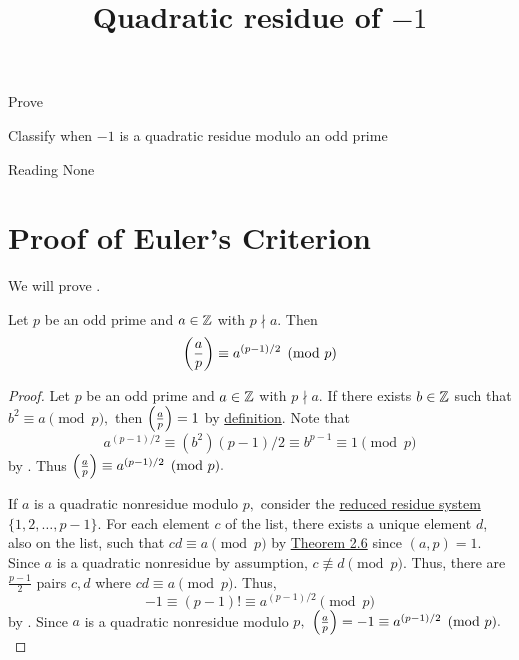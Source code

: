 \documentclass{ximera}
\title{Quadratic residue of $-1$}
\begin{document}
\begin{abstract}
\end{abstract}
\maketitle


\begin{obj}
    \item Prove 
	\item Classify when $-1$ is a quadratic residue modulo an odd prime
\end{obj}


\begin{pre}
    \item[Reading] None
\end{pre}

\section{Proof of Euler's Criterion}

We will prove . 

\begin{theorem}
    Let $p$ be an odd prime and $a\in\mathbb Z$ with $p\nmid a.$ Then \[\left(\frac{a}{p}\right)\equiv a^{(p-1)/2}\pmod{p}\]
\end{theorem}

\begin{proof}
	Let $p$ be an odd prime and $a\in\mathbb Z$ with $p\nmid a.$ If there exists $b\in\mathbb Z$ such that $b^2\equiv a\pmod{p},$ then $\left(\frac{a}{p}\right)=1$ by \hyperref[defn:legendre]{definition}.
	Note that \[a^{(p-1)/2}\equiv (b^2){(p-1)/2}\equiv b^{p-1}\equiv 1\pmod{p}\]
	by . Thus $\left(\frac{a}{p}\right)\equiv a^{(p-1)/2}\pmod{p}.$
	
	If $a$ is a quadratic nonresidue modulo $p,$ consider the \hyperref[defn:reduced-res-sys]{reduced residue system} $\{1,2,\dots,p-1\}.$ For each element $c$ of the list, there exists a unique element $d$, also on the list, such that $cd\equiv a\pmod{p}$ by \hyperref[thm:lin-cong-solutions]{Theorem 2.6} since $(a,p)=1$. Since $a$ is a quadratic nonresidue by assumption, $c\not\equiv d\pmod{p}.$ Thus, there are $\frac{p-1}{2}$ pairs $c,d$ where $cd\equiv a\pmod{p}.$ Thus, 
		\[
			-1\equiv (p-1)! \equiv a^{(p-1)/2}\pmod{p}
		\]
	by . Since $a$ is a quadratic nonresidue modulo $p,$ $\left(\frac{a}{p}\right)=-1\equiv a^{(p-1)/2}\pmod{p}.$
\end{proof}
\end{document}
